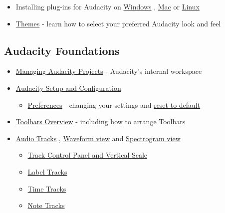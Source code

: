 \begin{multicols}{2}
\begin{itemize}
\item Installing plug-ins for Audacity on 
\hyperref[\foo{man_installing_effect_generator_and_analyzer_plug_ins_on_windows_}]{Windows}
, 
\hyperref[\foo{man_installing_effect_generator_and_analyzer_plug_ins_on_mac_os_x_}]{Mac}
 or 
\hyperref[\foo{man_installing_effect_generator_and_analyzer_plug_ins_on_linux_}]{Linux}

\item 
\hyperref[\foo{man_themes_}]{Themes}
 - learn how to select your preferred Audacity look and feel
\end{itemize}

\subsection{Audacity Foundations}
\begin{itemize}
\item 
\hyperref[\foo{man_audacity_projects_}]{Managing Audacity Projects}
 - Audacity's internal workspace 
\item 
\hyperref[\foo{man_audacity_setup_and_configuration_}]{Audacity Setup and Configuration}

\begin{itemize}
\item 
\hyperref[\foo{man_preferences_}]{Preferences}
 - changing your settings and 
\hyperref[\foo{man_faq_installation_and_plug_ins_reset}]{reset to default}

\end{itemize}

\item 
\hyperref[\foo{man_toolbars_overview_}]{Toolbars Overview}
 - including how to arrange Toolbars
\item 
\hyperref[\foo{man_audio_tracks_}]{Audio Tracks}
, 
\hyperref[\foo{man_audacity_waveform_}]{Waveform view}
 and 
\hyperref[\foo{man_spectrogram_view_}]{Spectrogram view}

\begin{itemize}
\item 
\hyperref[\foo{man_track_control_panel_and_vertical_scale_}]{Track Control Panel and Vertical Scale}

\item 
\hyperref[\foo{man_label_tracks_}]{Label Tracks}

\item 
\hyperref[\foo{man_time_tracks_}]{Time Tracks}

\item 
\hyperref[\foo{man_note_tracks_}]{Note Tracks}


\end{itemize}
\end{itemize}
\end{multicols}
